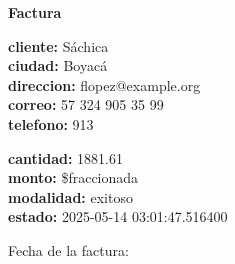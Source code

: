 \documentclass{article}
\begin{document}
\begin{center}
    {\LARGE \textbf{Factura}}\\[1cm]
\end{center}

\textbf{cliente:} Sáchica \\
\textbf{ciudad:} Boyacá \\
\textbf{direccion:} flopez@example.org \\
\textbf{correo:} 57 324 905 35 99 \\
\textbf{telefono:} 913 \\

\vspace{0.5cm}

\textbf{cantidad:} 1881.61 \\
\textbf{monto:} \$fraccionada \\
\textbf{modalidad:} exitoso \\
\textbf{estado:} 2025-05-14 03:01:47.516400 \\

\vspace{1cm}

Fecha de la factura: 
\end{document}
